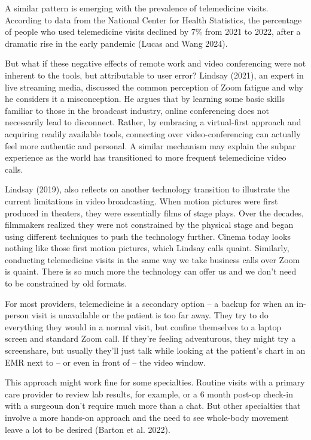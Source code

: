 \documentclass[
  letterpaper,
  DIV=11,
  numbers=noendperiod,
  oneside]{scrartcl}
\begin{document}
A similar pattern is emerging with the prevalence of telemedicine
visits. According to data from the National Center for Health
Statistics, the percentage of people who used telemedicine visits
declined by 7\% from 2021 to 2022, after a dramatic rise in the early
pandemic (Lucas and Wang 2024).

But what if these negative effects of remote work and video conferencing
were not inherent to the tools, but attributable to user error? Lindsay
(2021), an expert in live streaming media, discussed the common
perception of Zoom fatigue and why he considers it a misconception. He
argues that by learning some basic skills familiar to those in the
broadcast industry, online conferencing does not necessarily lead to
disconnect. Rather, by embracing a virtual-first approach and acquiring
readily available tools, connecting over video-conferencing can actually
feel more authentic and personal. A similar mechanism may explain the
subpar experience as the world has transitioned to more frequent
telemedicine video calls.

Lindsay (2019), also reflects on another technology transition to
illustrate the current limitations in video broadcasting. When motion
pictures were first produced in theaters, they were essentially films of
stage plays. Over the decades, filmmakers realized they were not
constrained by the physical stage and began using different techniques
to push the technology further. Cinema today looks nothing like those
first motion pictures, which Lindsay calls quaint. Similarly, conducting
telemedicine visits in the same way we take business calls over Zoom is
quaint. There is so much more the technology can offer us and we don't
need to be constrained by old formats.

For most providers, telemedicine is a secondary option -- a backup for
when an in-person visit is unavailable or the patient is too far away.
They try to do everything they would in a normal visit, but confine
themselves to a laptop screen and standard Zoom call. If they're feeling
adventurous, they might try a screenshare, but usually they'll just talk
while looking at the patient's chart in an EMR next to -- or even in
front of -- the video window.

This approach might work fine for some specialties. Routine visits with
a primary care provider to review lab results, for example, or a 6 month
post-op check-in with a surgeoun don't require much more than a chat.
But other specialties that involve a more hands-on approach and the need
to see whole-body movement leave a lot to be desired (Barton et al.
2022).
\end{document}
